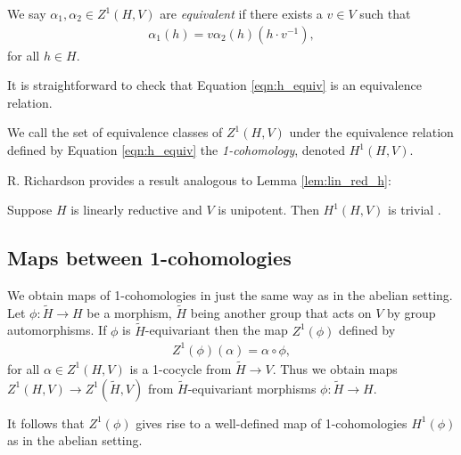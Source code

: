 We say $\alpha_1, \alpha_2 \in Z^1(H, V)$ are \emph{equivalent} if there exists a $v \in V$ such that
\begin{align}
  \alpha_1(h) = v \alpha_2(h) (h \cdot v^{-1}),
  \label{eqn:h_equiv}
\end{align}
for all $h \in H$.

It is straightforward to check that Equation \ref{eqn:h_equiv} is an equivalence relation.

We call the set of equivalence classes of $Z^1(H, V)$ under the equivalence relation defined by Equation \ref{eqn:h_equiv} the \emph{1-cohomology}, denoted $H^1(H, V)$.

R. Richardson provides a result analogous to Lemma \ref{lem:lin_red_h}:
\begin{lemma}
  Suppose $H$ is linearly reductive and $V$ is unipotent. Then $H^1(H, V)$ is trivial \cite[Lemma 6.2.6]{richardson1982orbits}.
  \label{lem:nonab_lin_red}
\end{lemma}

\subsection{Maps between 1-cohomologies}

We obtain maps of 1-cohomologies in just the same way as in the abelian setting. Let $\phi: \tilde{H} \rightarrow H$ be a morphism, $\tilde{H}$ being another group that acts on $V$ by group automorphisms. If $\phi$ is $\tilde{H}$-equivariant then the map $Z^1(\phi)$ defined by
\begin{align}
  Z^1(\phi)(\alpha) = \alpha \circ \phi,
\end{align}
for all $\alpha \in Z^1(H, V)$ is a 1-cocycle from $\tilde{H} \rightarrow V$. Thus we obtain maps $Z^1(H, V) \rightarrow Z^1(\tilde{H}, V)$ from $\tilde{H}$-equivariant morphisms $\phi: \tilde{H} \rightarrow H$.

It follows that $Z^1(\phi)$ gives rise to a well-defined map of 1-cohomologies $H^1(\phi)$ as in the abelian setting.

